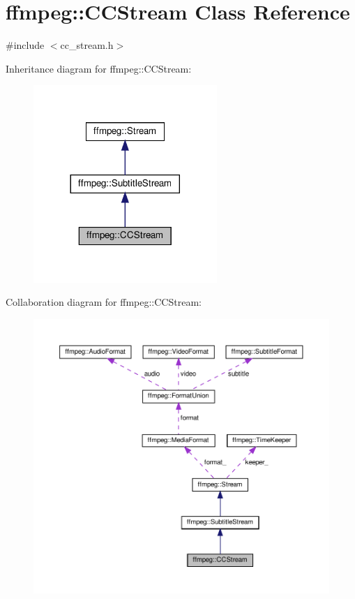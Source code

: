 \hypertarget{classffmpeg_1_1CCStream}{}\section{ffmpeg\+:\+:C\+C\+Stream Class Reference}
\label{classffmpeg_1_1CCStream}


{\ttfamily \#include $<$cc\+\_\+stream.\+h$>$}



Inheritance diagram for ffmpeg\+:\+:C\+C\+Stream\+:
\nopagebreak
\begin{figure}[H]
\begin{center}
\leavevmode
\includegraphics[width=197pt]{classffmpeg_1_1CCStream__inherit__graph}
\end{center}
\end{figure}


Collaboration diagram for ffmpeg\+:\+:C\+C\+Stream\+:
\nopagebreak
\begin{figure}[H]
\begin{center}
\leavevmode
\includegraphics[width=350pt]{classffmpeg_1_1CCStream__coll__graph}
\end{center}
\end{figure}
